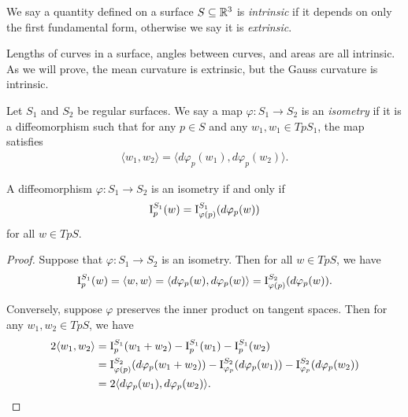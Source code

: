 \begin{defn}
    We say a quantity defined on a surface $S \subseteq \mathbb{R}^3$ is \emph{intrinsic} if it depends on only the first fundamental form, otherwise we say it is \emph{extrinsic}.
\end{defn}

\begin{exmp}
    Lengths of curves in a surface, angles between curves, and areas are all intrinsic. As we will prove, the mean curvature is extrinsic, but the Gauss curvature is intrinsic.
\end{exmp}

\begin{defn}
    Let $S_1$ and $S_2$ be regular surfaces. We say a map $\varphi: S_1 \to S_2$ is an \emph{isometry} if it is a diffeomorphism such that for any $p \in S$ and any $w_1, w_1 \in TpS_1$, the map satisfies
    \begin{align*}
        \langle w_1, w_2\rangle = \langle d\varphi_p(w_1), d\varphi_p(w_2)\rangle.
    \end{align*}
\end{defn}

\begin{prop}\label{prop:isometry-iff-preserves-ffform}
    A diffeomorphism $\varphi: S_1 \to S_2$ is an isometry if and only if
    \begin{align*}
        \operatorname{I}_p^{S_1}(w) = \operatorname{I}_{\varphi(p)}^{S_1}(d\varphi_p(w))
    \end{align*}
    for all $w \in TpS$.
\end{prop}

\begin{proof}
    Suppose that $\varphi: S_1 \to S_2$ is an isometry. Then for all $w \in TpS$, we have
    \begin{align*}
        \operatorname{I}_p^{S_1}(w) = \langle w, w\rangle = \langle d\varphi_p(w), d\varphi_p(w)\rangle = \operatorname{I}_{\varphi(p)}^{S_2}(d\varphi_p(w)).
    \end{align*}

    Conversely, suppose $\varphi$ preserves the inner product on tangent spaces. Then for any $w_1, w_2 \in TpS$, we have
    \begin{align*}
        2\langle w_1, w_2\rangle &= \operatorname{I}_p^{S_1}(w_1 + w_2) - \operatorname{I}_{p}^{S_1}(w_1) - \operatorname{I}_{p}^{S_1}(w_2) \\
        &= \operatorname{I}_{\varphi(p)}^{S_2}(d\varphi_p(w_1 + w_2)) - \operatorname{I}_{\varphi_p}^{S_2}(d\varphi_p(w_1)) - \operatorname{I}_{\varphi_p}^{S_2}(d\varphi_p(w_2)) \\
        &= 2\langle d\varphi_p(w_1), d\varphi_p(w_2)\rangle.
    \end{align*}
\end{proof}

